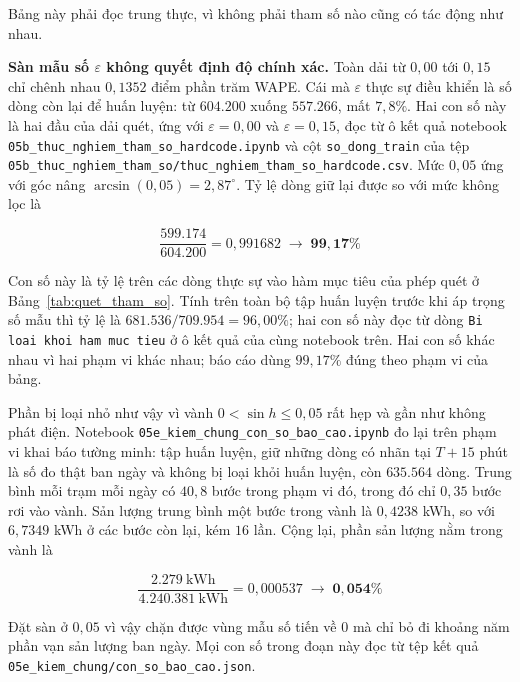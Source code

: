 \documentclass[12pt, a4paper]{report}
\begin{document}
Bảng này phải đọc trung thực, vì không phải tham số nào cũng có tác động như nhau.

\textbf{Sàn mẫu số $\varepsilon$ không quyết định độ chính xác.} Toàn dải từ $0{,}00$ tới
$0{,}15$ chỉ chênh nhau $0{,}1352$ điểm phần trăm WAPE. Cái mà $\varepsilon$ thực sự điều
khiển là số dòng còn lại để huấn luyện: từ $604.200$ xuống $557.266$, mất $7{,}8\%$. Hai
con số này là hai đầu của dải quét, ứng với $\varepsilon = 0{,}00$ và $\varepsilon = 0{,}15$,
đọc từ ô kết quả notebook \texttt{05b\_thuc\_nghiem\_tham\_so\_hardcode.ipynb} và cột
\texttt{so\_dong\_train} của tệp \texttt{05b\_thuc\_nghiem\_tham\_so/thuc\_nghiem\_tham\_so\_hardcode.csv}.
Mức $0{,}05$ ứng với góc nâng $\arcsin(0{,}05) = 2{,}87^\circ$. Tỷ lệ dòng giữ lại được so với mức
không lọc là

\begin{equation}
\frac{599.174}{604.200} = 0{,}991682 \;\longrightarrow\; \mathbf{99{,}17\%}
\end{equation}

Con số này là tỷ lệ trên các dòng thực sự vào hàm mục tiêu của phép quét ở
Bảng~\ref{tab:quet_tham_so}. Tính trên toàn bộ tập huấn luyện trước khi áp trọng số mẫu thì
tỷ lệ là $681.536 / 709.954 = 96{,}00\%$; hai con số này đọc từ dòng
\texttt{Bi loai khoi ham muc tieu} ở ô kết quả của cùng notebook trên. Hai con số khác nhau vì hai phạm vi khác nhau; báo
cáo dùng $99{,}17\%$ đúng theo phạm vi của bảng.

Phần bị loại nhỏ như vậy vì vành $0 < \sin h \le 0{,}05$ rất hẹp và gần như không phát điện.
Notebook \texttt{05e\_kiem\_chung\_con\_so\_bao\_cao.ipynb} đo lại trên phạm vi khai báo tường minh:
tập huấn luyện, giữ những dòng có nhãn tại $T{+}15$ phút là số đo thật ban ngày và không bị
loại khỏi huấn luyện, còn $635.564$ dòng. Trung bình mỗi trạm mỗi ngày có $40{,}8$ bước trong
phạm vi đó, trong đó chỉ $0{,}35$ bước rơi vào vành. Sản lượng trung bình một bước trong vành
là $0{,}4238$ kWh, so với $6{,}7349$ kWh ở các bước còn lại, kém $16$ lần. Cộng lại, phần sản
lượng nằm trong vành là

\begin{equation}
\frac{2.279\ \text{kWh}}{4.240.381\ \text{kWh}} = 0{,}000537 \;\longrightarrow\;
\mathbf{0{,}054\%}
\end{equation}

Đặt sàn ở $0{,}05$ vì vậy chặn được vùng mẫu số tiến về $0$ mà chỉ bỏ đi khoảng năm phần vạn
sản lượng ban ngày. Mọi con số trong đoạn này đọc từ tệp kết quả
\texttt{05e\_kiem\_chung/con\_so\_bao\_cao.json}.
\end{document}
